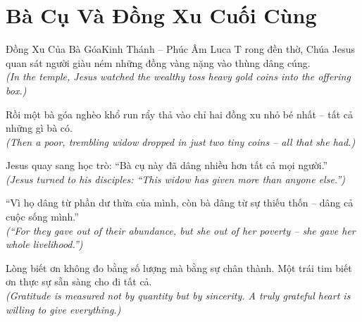 \section{Bà Cụ Và Đồng Xu Cuối Cùng}
\begin{truyen}{Đồng Xu Của Bà Góa}{Kinh Thánh -- Phúc Âm Luca}
T rong đền thờ, Chúa Jesus quan sát người giàu ném những đồng vàng nặng vào thùng dâng cúng.\\
\textit{(In the temple, Jesus watched the wealthy toss heavy gold coins into the offering box.)}

Rồi một bà góa nghèo khổ run rẩy thả vào chỉ hai đồng xu nhỏ bé nhất -- tất cả những gì bà có.\\
\textit{(Then a poor, trembling widow dropped in just two tiny coins -- all that she had.)}

Jesus quay sang học trò: ``Bà cụ này đã dâng nhiều hơn tất cả mọi người.''\\
\textit{(Jesus turned to his disciples: ``This widow has given more than anyone else.'')}

``Vì họ dâng từ phần dư thừa của mình, còn bà dâng từ sự thiếu thốn -- dâng cả cuộc sống mình.''\\
\textit{(``For they gave out of their abundance, but she out of her poverty -- she gave her whole livelihood.'')}

\end{truyen}
\begin{baihoc}
  Lòng biết ơn không đo bằng số lượng mà bằng sự chân thành. Một trái tim biết ơn thực sự sẵn sàng cho đi tất cả.\\
  \textit{(Gratitude is measured not by quantity but by sincerity. A truly grateful heart is willing to give everything.)}
\end{baihoc}
